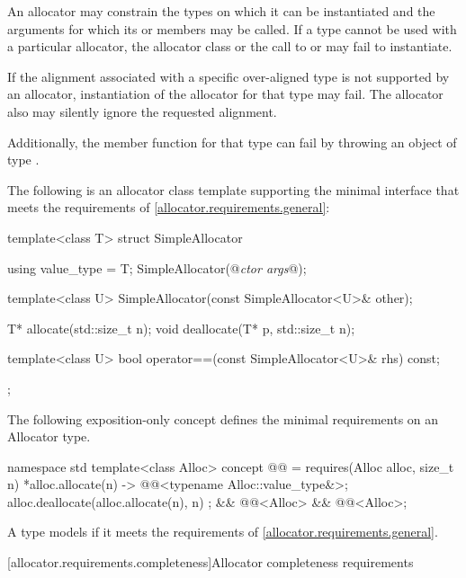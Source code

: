 \pnum
An allocator may constrain the types on which it can be instantiated and the
arguments for which its  or  members may be
called. If a type cannot be used with a particular allocator, the allocator
class or the call to  or  may fail to instantiate.

\pnum
If the alignment associated with a specific over-aligned type is not
supported by an allocator, instantiation of the allocator for that type may
fail. The allocator also may silently ignore the requested alignment.
\begin{note}
Additionally, the member function 
for that type can fail by throwing an object of type
.
\end{note}

\pnum
\begin{example}
The following is an allocator class template supporting the minimal
interface that meets the requirements of \ref{allocator.requirements.general}:

\begin{codeblock}
template<class T>
struct SimpleAllocator {
  using value_type = T;
  SimpleAllocator(@\textit{ctor args}@);

  template<class U> SimpleAllocator(const SimpleAllocator<U>& other);

  T* allocate(std::size_t n);
  void deallocate(T* p, std::size_t n);

  template<class U> bool operator==(const SimpleAllocator<U>& rhs) const;
};
\end{codeblock}
\end{example}

\pnum
The following exposition-only concept defines
the minimal requirements on an Allocator type.
\begin{codeblock}
namespace std {
  template<class Alloc>
  concept @@ =
    requires(Alloc alloc, size_t n) {
      { *alloc.allocate(n) } -> @@<typename Alloc::value_type&>;
      { alloc.deallocate(alloc.allocate(n), n) };
    } &&
    @@<Alloc> &&
    @@<Alloc>;
}
\end{codeblock}
A type  models 
if it meets the requirements of \ref{allocator.requirements.general}.

[allocator.requirements.completeness]{Allocator completeness requirements}

